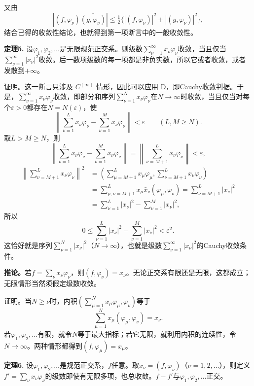 \documentclass[fontsize=13pt,twoside,openany,headings=normal,parskip=false,bookmarkpackage=false,DIV=calc]{scrbook}
\newcommand{\textkaishu}[1]{{\zhkaishu #1}}
\begin{document}
又由
\[
|(f,\varphi_\nu)\overline{(g,\varphi_\nu)}|
\leq\tfrac12\bigl\{|(f,\varphi_\nu)|^2+|(g,\varphi_\nu)|^2\bigr\},
\]
结合已得的收敛性结论，也就得到第一项断言中的一般收敛性。

\leavevmode{}\textbf{定理5.}\label{thm:II.5} 设$\varphi_1,\allowbreak \varphi_2,\allowbreak \ldots$是无限规范正交系。则级数$\sum_{\nu=1}^\infty x_\nu\varphi_\nu$收敛，当且仅当$\sum_{\nu=1}^\infty|x_\nu|^2$收敛。后一数项级数的每一项都是非负实数，所以它或者收敛，或者发散到$+\infty$。

\textkaishu{证明。}这一断言只涉及 \hyperref[ax:II.Cinfty]{$C^{(\infty)}$} 情形，因此可以应用 \hyperref[ax:II.D]{D}，即Cauchy收敛判据。于是，$\sum_{\nu=1}^\infty x_\nu\varphi_\nu$收敛，即部分和序列$\sum_{\nu=1}^Nx_\nu\varphi_\nu$在$N\to\infty$时收敛，当且仅当对每个$\varepsilon>0$都存在$N=N(\varepsilon)$，使
\[
\left\|\sum_{\nu=1}^Lx_\nu\varphi_\nu-
\sum_{\nu=1}^Mx_\nu\varphi_\nu\right\|<\varepsilon
\qquad(L,M\geq N).
\]
取$L>M\geq N$，则
\[
\left\|\sum_{\nu=1}^Lx_\nu\varphi_\nu-
\sum_{\nu=1}^Mx_\nu\varphi_\nu\right\|
=\left\|\sum_{\nu=M+1}^Lx_\nu\varphi_\nu\right\|<\varepsilon,
\]
\begin{align*}
\left\|\sum_{\nu=M+1}^Lx_\nu\varphi_\nu\right\|^2
&=\left(\sum_{\mu=M+1}^Lx_\mu\varphi_\mu,
\sum_{\nu=M+1}^Lx_\nu\varphi_\nu\right)\\
&=\sum_{\mu,\nu=M+1}^Lx_\mu\bar x_\nu(\varphi_\mu,\varphi_\nu)
=\sum_{\nu=M+1}^L|x_\nu|^2\\
&=\sum_{\nu=1}^L|x_\nu|^2-\sum_{\nu=1}^M|x_\nu|^2,
\end{align*}
所以
\[
0\leq\sum_{\nu=1}^L|x_\nu|^2-\sum_{\nu=1}^M|x_\nu|^2<\varepsilon^2.
\]
这恰好就是序列$\sum_{\nu=1}^N|x_\nu|^2$（$N\to\infty$），也就是级数$\sum_{\nu=1}^\infty|x_\nu|^2$的Cauchy收敛条件。

\textbf{推论。}若$f=\sum_\nu x_\nu\varphi_\nu$，则$(f,\allowbreak \varphi_\nu)=x_\nu$。无论正交系有限还是无限，这都成立；无限情形当然须假定级数收敛。

\hypertarget{origpage-28}{}\label{origpage-28}\textkaishu{证明。}当$N\geq\nu$时，内积$(\sum_{\mu=1}^Nx_\mu\varphi_\mu,\allowbreak \varphi_\nu)$等于
\[
\sum_{\mu=1}^Nx_\mu(\varphi_\mu,\varphi_\nu)=x_\nu.
\]
若$\varphi_1,\allowbreak \varphi_2,\allowbreak \ldots$有限，就令$N$等于最大指标；若它无限，就利用内积的连续性，令$N\to\infty$。两种情形都得到$(f,\allowbreak \varphi_\mu)=x_\mu$。

\leavevmode{}\textbf{定理6.}\label{thm:II.6} 设$\varphi_1,\allowbreak \varphi_2,\allowbreak \ldots$是规范正交系，$f$任意。取$x_\nu=(f,\allowbreak \varphi_\nu)$（$\nu=1,\allowbreak 2,\allowbreak \ldots$），则定义$f'=\sum_\nu x_\nu\varphi_\nu$的级数即使有无限多项，也总收敛。$f-f'$与$\varphi_1,\allowbreak \varphi_2,\allowbreak \ldots$正交。
\end{document}
